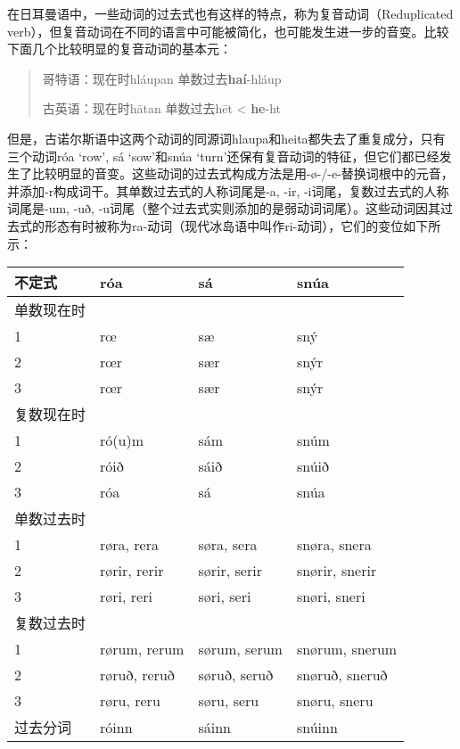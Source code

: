 在日耳曼语中，一些动词的过去式也有这样的特点，称为复音动词（Reduplicated verb），但复音动词在不同的语言中可能被简化，也可能发生进一步的音变。比较下面几个比较明显的复音动词的基本元：

\begin{quote}
    哥特语：现在时hláupan 单数过去\textbf{haí}-hláup

    古英语：现在时hātan 单数过去hēt < \textbf{he}-ht
\end{quote}

但是，古诺尔斯语中这两个动词的同源词hlaupa和heita都失去了重复成分，只有三个动词róa `row‌', sá `sow‌'和snúa `turn‌'还保有复音动词的特征，但它们都已经发生了比较明显的音变。这些动词的过去式构成方法是用-ø-/-e-替换词根中的元音，并添加-r构成词干。其单数过去式的人称词尾是-a, -ir, -i词尾，复数过去式的人称词尾是-um, -uð, -u词尾（整个过去式实则添加的是弱动词词尾）。这些动词因其过去式的形态有时被称为ra-动词（现代冰岛语中叫作ri-动词），它们的变位如下所示：

\begin{longtable}{llll}
    \toprule
    不定式   & róa          & sá           & snúa           \\
    \midrule
    \endhead
    \bottomrule
    \endfoot
    单数现在时 &              &              &                \\
    1     & rœ           & sæ           & sný            \\
    2     & rœr          & sær          & snýr           \\
    3     & rœr          & sær          & snýr           \\
    复数现在时 &              &              &                \\
    1     & ró(u)m       & sám          & snúm           \\
    2     & róið         & sáið         & snúið          \\
    3     & róa          & sá           & snúa           \\
    单数过去时 &              &              &                \\
    1     & røra, rera   & søra, sera   & snøra, snera   \\
    2     & rørir, rerir & sørir, serir & snørir, snerir \\
    3     & røri, reri   & søri, seri   & snøri, sneri   \\
    复数过去时 &              &              &                \\
    1     & rørum, rerum & sørum, serum & snørum, snerum \\
    2     & røruð, reruð & søruð, seruð & snøruð, sneruð \\
    3     & røru, reru   & søru, seru   & snøru, sneru   \\
    过去分词  & róinn        & sáinn        & snúinn         \\
\end{longtable}

